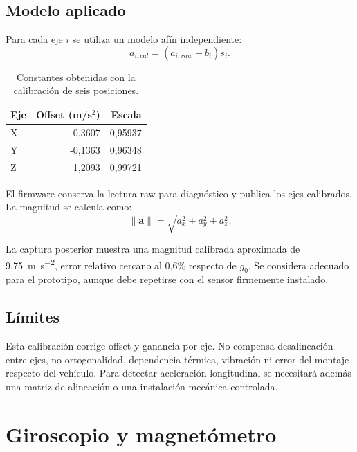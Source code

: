\documentclass[11pt,a4paper,oneside]{report}
\begin{document}

\section{Modelo aplicado}
Para cada eje $i$ se utiliza un modelo afín independiente:
\[
a_{i,cal}=(a_{i,raw}-b_i)s_i.
\]

\begin{table}[H]\centering
\caption{Constantes obtenidas con la calibración de seis posiciones.}
\begin{tabular}{lrr}
\toprule
\textbf{Eje} & \textbf{Offset (m/s$^2$)} & \textbf{Escala}\\
\midrule
X & -0,3607 & 0,95937\\
Y & -0,1363 & 0,96348\\
Z &  1,2093 & 0,99721\\
\bottomrule
\end{tabular}
\end{table}

El firmware conserva la lectura raw para diagnóstico y publica los ejes calibrados.
La magnitud se calcula como:
\[
\lVert \mathbf{a}\rVert=\sqrt{a_x^2+a_y^2+a_z^2}.
\]


\begin{vsevidence}
La captura posterior muestra una magnitud calibrada aproximada de
\SI{9.75}{\meter\per\second\squared}, error relativo cercano al 0,6\% respecto de
$g_0$. Se considera adecuado para el prototipo, aunque debe repetirse con el sensor
firmemente instalado.
\end{vsevidence}

\section{Límites}
Esta calibración corrige offset y ganancia por eje. No compensa desalineación entre
ejes, no ortogonalidad, dependencia térmica, vibración ni error del montaje respecto
del vehículo. Para detectar aceleración longitudinal se necesitará además una matriz
de alineación o una instalación mecánica controlada.

\chapter{Giroscopio y magnetómetro}
\end{document}
